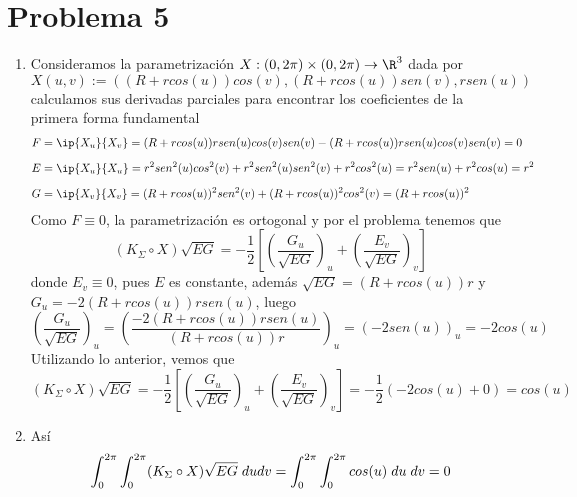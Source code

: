 \documentclass{article}
\begin{document}
\section*{Problema 5}
\begin{enumerate}
    \item Consideramos la parametrización $X:(0,2\pi)\times(0,2\pi)\to\R^{3}$ dada por
    \begin{equation*}
        X(u,v):=((R+rcos(u))cos(v),(R+rcos(u))sen(v),rsen(u))
    \end{equation*}
    calculamos sus derivadas parciales para encontrar los coeficientes de la primera forma 
    fundamental
    \begin{align*}
        F &= \ip{X_{u}}{X_{v}}=(R+rcos(u))rsen(u)cos(v)sen(v)-(R+rcos(u))rsen(u)cos(v)sen(v)=0 
        \\[2mm]
        E &= \ip{X_{u}}{X_{u}}=r^{2}sen^{2}(u)cos^{2}(v)+r^{2}sen^{2}(u)sen^{2}(v)+r^{2}cos^{2}(u)
        =r^{2}sen(u)+r^{2}cos(u)=r^{2} \\[2mm]
        G &= \ip{X_{v}}{X_{v}}=(R+rcos(u))^{2}sen^{2}(v)+(R+rcos(u))^{2}cos^{2}(v)=(R+rcos(u))^{2}
    \end{align*}
    Como $F\equiv0$, la parametrización es ortogonal y por el problema tenemos que
    \begin{equation*}
        (K_{\Sigma}\circ X)\sqrt{EG}=-\frac{1}{2}\left[\left(\frac{G_{u}}{\sqrt{EG}}\right)_{u}
        +\left(\frac{E_{v}}{\sqrt{EG}}\right)_{v}\right]
    \end{equation*}
    donde $E_{v}\equiv0$, pues $E$ es constante, además $\sqrt{EG}=(R+rcos(u))r$ y $G_{u}
    =-2(R+rcos(u))rsen(u)$, luego
    \begin{equation*}
        \left(\frac{G_{u}}{\sqrt{EG}}\right)_{u}=\left(\frac{-2(R+rcos(u))rsen(u)}{(R+rcos(u))r}
        \right)_{u}=(-2sen(u))_{u}=-2cos(u)
    \end{equation*}
    Utilizando lo anterior, vemos que
    \begin{equation*}
        (K_{\Sigma}\circ X)\sqrt{EG}=-\frac{1}{2}\left[\left(\frac{G_{u}}{\sqrt{EG}}\right)_{u}
        +\left(\frac{E_{v}}{\sqrt{EG}}\right)_{v}\right]=-\frac{1}{2}(-2cos(u)+0)=cos(u)
    \end{equation*}

    \item Así
    \begin{equation*}
        \int_{0}^{2\pi}\int_{0}^{2\pi}(K_{\Sigma}\circ X)\sqrt{EG}\hspace{1mm}dudv
        =\int_{0}^{2\pi}\int_{0}^{2\pi}cos(u)\hspace{1mm}du\hspace{1mm}dv=0
    \end{equation*}
\end{enumerate}

\end{document}
